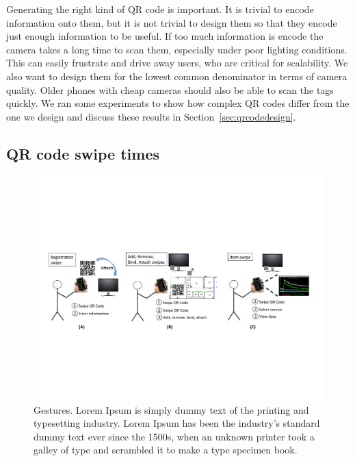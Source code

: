 Generating the right kind of QR code is important.  It is trivial to
encode information onto them, but it is
not trivial to design them so that they encode just enough information to be useful.  If 
too much information is encode the camera takes a long time to scan them, especially under poor lighting
conditions.  This can easily frustrate and drive away users, who are critical for scalability.
We also want to design them for the lowest common denominator in terms of camera quality.  Older
phones with cheap cameras should also be able to scan the tags quickly.  We ran some experiments to show
how complex QR codes differ from the one we design and discuss these results in Section~\ref{sec:qrcodedesign}.

\subsection{QR code swipe times}
\begin{figure}[htb!]
\begin{center}
\includegraphics[width=\textwidth]{figs/swipes}
\caption{Gestures. Lorem Ipsum is simply dummy text of the printing and typesetting industry. Lorem Ipsum has 
been the industry's standard dummy text ever since the 1500s, when an unknown printer took a galley of 
type and scrambled it to make a type specimen book.  }
\label{fig:gestures}
\end{center}
\end{figure}

